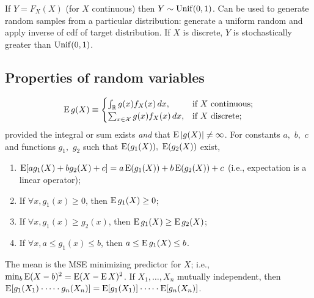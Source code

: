 \documentclass[8pt,letterpaper, landscape]{extarticle} %
\newcommand{\X}{\ensuremath{\mathcal{X}}}
\begin{document}
\begin{multicols}{3}
\begin{description}
 If $ Y = F_X(X) $ (for $ X $ continuous) then $ Y \sim \operatorname{Unif} (0,1) $. Can be used to generate random samples from a particular distribution: generate a uniform random and apply inverse of cdf of target distribution. If $ X $ is discrete, $ Y $ is stochastically greater than $ \operatorname{Unif} (0,1) $.

\subsection{Properties of random variables}
$$ \E g(X) \equiv \begin{cases}
\int_\R g(x) f_X (x) \, dx, & \text{if $ X $ continuous;} \\
\sum_{x \in \X} g(x) f_X (x) \, dx, & \text{if $ X $ discrete;}
\end{cases} $$
provided the integral or sum exists \textit{and} that $ \operatorname{E} |g(X)| \neq \infty $. For constants $ a, $ $ b, $ $ c $ and functions $ g_1, $ $ g_2 $ such that $ \operatorname{E}(g_1(X)), $ $ \operatorname{E}(g_2(X)) $ exist,
\begin{enumerate}
\item $ \operatorname{E} [a g_1(X) + b g_2(X) + c] = a \operatorname{E}(g_1(X)) + b \operatorname{E}(g_2(X)) + c $ (i.e., expectation is a linear operator);
\item If $ \forall x, g_1(x) \geq 0 $, then $ \operatorname{E} g_1 (X) \geq 0 $;
\item If $ \forall x, g_1(x) \geq g_2 (x) $, then $ \operatorname{E} g_1 (X) \geq \operatorname{E} g_2 (X) $;
\item If $ \forall x, a \leq g_1(x) \leq b $, then $ a \leq\operatorname{E} g_1 (X) \leq b $.
\end{enumerate}
The mean is the MSE minimizing predictor for $ X $; i.e., $ \min_b \operatorname{E} (X - b)^2 = \operatorname{E} (X - \operatorname{E} X)^2 $. If $ X_1, \dotsc , X_n $ mutually independent, then $ \operatorname{E} [ g_1(X_1) \cdot \dotsb \cdot g_n(X_n) ] = \operatorname{E} [ g_1(X_1)] \cdot \dotsb \cdot \operatorname{E} [g_n(X_n) ] $.


\end{description}
\end{multicols}
\end{document}
